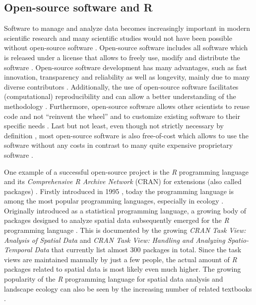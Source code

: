 \documentclass[smallextended]{svjour3}       %
\begin{document}
\hypertarget{sec:open_source}{%
\subsection{Open-source software and R}\label{sec:open_source}}

Software to manage and analyze data becomes increasingly important in modern scientific research \cite{Wilson2014} and many scientific studies would not have been possible without open-source software \cite{Prlic2012}.
Open-source software includes all software which is released under a license that allows to freely use, modify and distribute the software \cite{St.Laurent2008}.
Open-source software development has many advantages, such as fast innovation, transparency and reliability as well as longevity, mainly due to many diverse contributors \cite{vonKrogh2006,St.Laurent2008}.
Additionally, the use of open-source software facilitates (computational) reproducibility and can allow a better understanding of the methodology \cite{Prlic2012,Powers2019}.
Furthermore, open-source software allows other scientists to reuse code and not ``reinvent the wheel'' \cite{Prlic2012} and to customize existing software to their specific needs \cite{Steiniger2009}.
Last but not least, even though not strictly necessary by definition \cite{Steiniger2009,Steiniger2009a}, most open-source software is also free-of-cost which allows to use the software without any costs in contrast to many quite expensive proprietary software \cite{vonKrogh2006,Steiniger2009,Steiniger2009a}.

One example of a successful open-source project is the \emph{R} programming language and its \emph{Comprehensive R Archive Network} (CRAN) for extensions (also called packages) \cite{RCoreTeam2019}.
Firstly introduced in 1995 \cite{Smith2016}, today the programming language is among the most popular programming languages, especially in ecology \cite{Lai2019}.
Originally introduced as a statistical programming language, a growing body of packages designed to analyze spatial data subsequently emerged for the \emph{R} programming language \cite{Bivand2006}.
This is documented by the growing \emph{CRAN Task View: Analysis of Spatial Data} \cite{Bivand2019a} and \emph{CRAN Task View: Handling and Analyzing Spatio-Temporal Data} \cite{Pebesma2020} that currently list almost 300 packages in total.
Since the task views are maintained manually by just a few people, the actual amount of \emph{R} packages related to spatial data is most likely even much higher.
The growing popularity of the \emph{R} programming language for spatial data analysis and landscape ecology can also be seen by the increasing number of related textbooks \cite{Fletcher2019,Lovelace2019,Pebesma2019a}.
\end{document}
